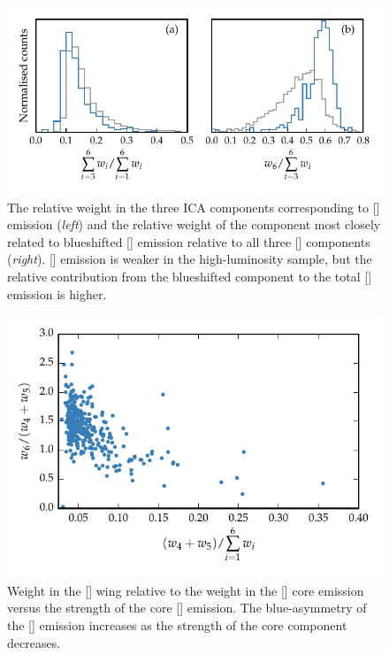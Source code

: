 \begin{figure}
    \centering
    \includegraphics[width=\textwidth]{figures/chapter04/mfica_oiii_weight.pdf} 
    \caption[{he relative weight in the three \ac{ICA} components corresponding to [] emission and the relative weight of the component most closely related to blueshifted [] emission relative to all three [] components.}]{The relative weight in the three \ac{ICA} components corresponding to [] emission ({\em left}) and the relative weight of the component most closely related to blueshifted [] emission relative to all three [] components ({\em right}). [] emission is weaker in the high-luminosity sample, but the relative contribution from the blueshifted component to the total [] emission is higher.}     
    \label{fig:mfica_oiii_weight}
\end{figure}

\begin{figure}
    \centering
    \includegraphics[width=\columnwidth]{figures/chapter04/oiii_core_strength_blueshift.pdf} 
    \caption[{Weight in the [] wing relative to the weight in the [] core emission versus the strength of the core [] emission.}]{Weight in the [] wing relative to the weight in the [] core emission versus the strength of the core [] emission. The blue-asymmetry of the [] emission increases as the strength of the core component decreases.}     
    \label{fig:oiii_core_strength_blueshift}
\end{figure}

